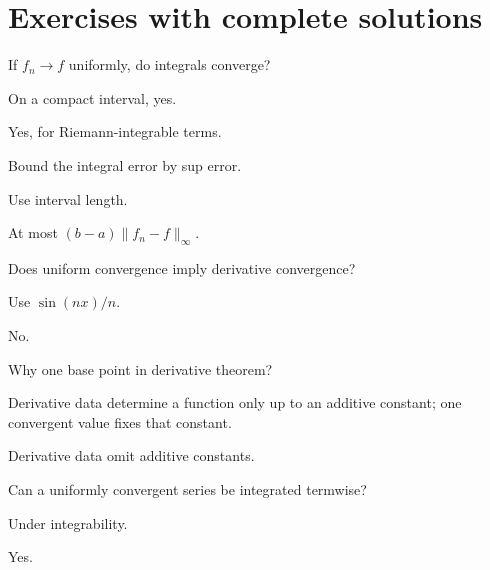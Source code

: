 \section{Exercises with complete solutions}

\begin{exercise}\label{exr:ii12-01}
If $f_n\to f$ uniformly, do integrals converge?
\end{exercise}
\begin{hint}
On a compact interval, yes.
\end{hint}
\begin{solution}
Yes, for Riemann-integrable terms.
\end{solution}

\begin{exercise}\label{exr:ii12-02}
Bound the integral error by sup error.
\end{exercise}
\begin{hint}
Use interval length.
\end{hint}
\begin{solution}
At most $(b-a)\|f_n-f\|_\infty$.
\end{solution}

\begin{exercise}\label{exr:ii12-03}
Does uniform convergence imply derivative convergence?
\end{exercise}
\begin{hint}
Use $\sin(nx)/n$.
\end{hint}
\begin{solution}
No.
\end{solution}

\begin{exercise}\label{exr:ii12-04}
Why one base point in derivative theorem?
\end{exercise}
\begin{hint}
Derivative data determine a function only up to an additive constant; one convergent value fixes that constant.
\end{hint}
\begin{solution}
Derivative data omit additive constants.
\end{solution}

\begin{exercise}\label{exr:ii12-05}
Can a uniformly convergent series be integrated termwise?
\end{exercise}
\begin{hint}
Under integrability.
\end{hint}
\begin{solution}
Yes.
\end{solution}

